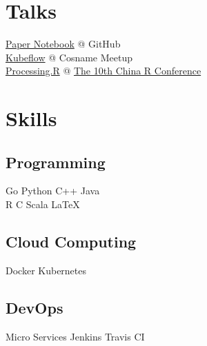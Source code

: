 \documentclass[]{deedy-resume-openfont}
\begin{document}
\begin{minipage}[t]{0.25\textwidth}
\section{Talks}
\sectionsep
\href{https://github.com/gaocegege/papers-notebook}{Paper Notebook} @ GitHub \\
\href{https://docs.google.com/presentation/d/1ED24TCnlBVzyJz0aCEAtXQQh0_W1RKSeapP3QZ0fTKA/edit?usp=sharing}{Kubeflow} @ Cosname Meetup \\
\href{http://slides.com/gaocegege/processing-r}{Processing.R} @ \href{http://china-r.org/sh2017/index.html}{The 10th China R Conference}



\section{Skills}
\sectionsep
\subsection{Programming}
Go \textbullet{} Python \textbullet{} C++ \textbullet{} Java \\
R \textbullet{} C \textbullet{} Scala \textbullet{} \LaTeX\ \\
\sectionsep

\subsection{Cloud Computing}
Docker \textbullet{} Kubernetes \\
\sectionsep

\subsection{DevOps}
Micro Services \textbullet{} Jenkins \textbullet{} Travis CI

%
%

\end{minipage}
\hfill
\end{document}
